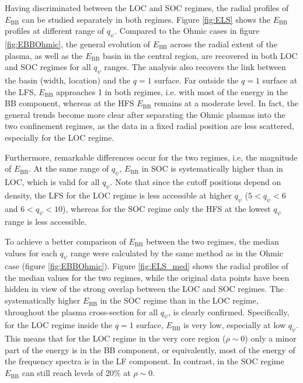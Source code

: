Having discriminated between the LOC and SOC regimes, the radial profiles of $E_\mathrm{BB}$ can be studied separately in both regimes. Figure \ref{fig:ELS} shows the $E_\mathrm{BB}$ profiles at different range of $q_{\psi}$. Compared to the Ohmic cases in figure \ref{fig:EBBOhmic}, the general evolution of $E_\mathrm{BB}$ across the radial extent of the plasma, as well as the $E_\mathrm{BB}$ basin in the central region, are recovered in both LOC and SOC regimes for all $q_{\psi}$ ranges. The analysis also recovers the link between the basin (width, location) and the $q = 1$ surface. Far outside the $q = 1$ surface at the LFS, $E_\mathrm{BB}$ approaches 1 in both regimes, i.e. with most of the energy in the BB component, whereas at the HFS $E_\mathrm{BB}$ remains at a moderate level. In fact, the general trends become more clear after separating the Ohmic plasmas into the two confinement regimes, as the data in a fixed radial position are less scattered, especially for the LOC regime.

Furthermore, remarkable differences occur for the two regimes, i.e, the magnitude of $E_\mathrm{BB}$. At the same range of $q_{\psi}$, $E_\mathrm{BB}$ in SOC is systematically higher than in LOC, which is valid for all $q_{\psi}$. Note that since the cutoff positions depend on density, the LFS for the LOC regime is less accessible at higher $q_{\psi}$ ($5 < q_{\psi} < 6$ and $6 < q_{\psi} < 10$), whereas for the SOC regime only the HFS at the lowest $q_{\psi}$ range is less accessible.

To achieve a better comparison of $E_\mathrm{BB}$ between the two regimes, the median values for each $q_{\psi}$ range were calculated by the same method as in the Ohmic case (figure \ref{fig:EBBOhmic}). Figure \ref{fig:ELS_med} shows the radial profiles of the median values for the two regimes, while the original data points have been hidden in view of the strong overlap between the LOC and SOC regimes. The systematically higher $E_\mathrm{BB}$ in the SOC regime than in the LOC regime, throughout the plasma cross-section for all $q_{\psi}$, is clearly confirmed. Specifically, for the LOC regime inside the $q = 1$ surface, $E_\mathrm{BB}$ is very low, especially at low $q_{\psi}$. This means that for the LOC regime in the very core region ($\rho \sim 0$) only a minor part of the energy is in the BB component, or equivalently, most of the energy of the frequency spectra is in the LF component. In contrast, in the SOC regime $E_\mathrm{BB}$ can still reach levels of 20\% at $\rho \sim 0$.


